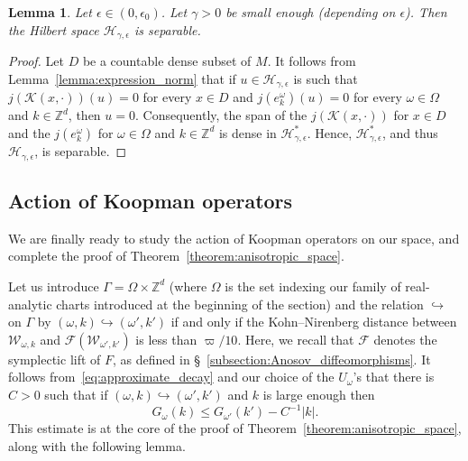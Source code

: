 \documentclass[10pt]{amsart}
\newtheorem{lemm}[theo]{Lemma}\newtheorem{prop}[theo]{Proposition}\newtheorem{coro}[theo]{Corollary}\newtheorem{conj}[theo]{Conjecture}
\theoremstyle{definition}\newtheorem{defi}[theo]{Definition}\newtheorem{rema}[theo]{Remark}\newtheorem{exam}[theo]{Example}\newtheorem{exem}[theo]{Example}\newtheorem{nota}[theo]{Notation}
\newcommand{\p}[1]{\left(#1\right)}
\newcommand{\va}[1]{\left|#1\right|}
\newcommand{\clH}{\mathcal{H}}
\newcommand{\clF}{\mathcal{F}}
\newcommand{\clW}{\mathcal{W}}
\newcommand{\clK}{\mathcal{K}}
\newcommand{\bbZ}{\mathbb{Z}}
\begin{document}
\begin{lemm}\label{lemma:separability}
Let $\epsilon \in (0,\epsilon_0)$. Let $\gamma > 0$ be small enough (depending on $\epsilon$). Then the Hilbert space $\clH_{\gamma,\epsilon}$ is separable.
\end{lemm}

\begin{proof}
Let $D$ be a countable dense subset of $M$. It follows from Lemma~\ref{lemma:expression_norm} that if $u \in \clH_{\gamma,\epsilon}$ is such that $j(\clK (x,\cdot))(u) = 0$ for every $x \in D$ and $j(e_k^\omega)(u)=0$ for every $\omega \in \Omega$ and $k \in \bbZ^d$, then $u = 0$. Consequently, the span of the $j(\clK (x,\cdot))$ for $x \in D$ and the $j(e_k^\omega)$ for $\omega \in \Omega$ and $k \in \bbZ^d$ is dense in $\clH_{\gamma,\epsilon}^*$. Hence, $\clH_{\gamma,\epsilon}^*$, and thus $\clH_{\gamma,\epsilon}$, is separable.
\end{proof}

\subsection{Action of Koopman operators}

We are finally ready to study the action of Koopman operators on our space, and complete the proof of Theorem~\ref{theorem:anisotropic_space}.

Let us introduce $\Gamma = \Omega \times \bbZ^d$ (where $\Omega$ is the set indexing our family of real-analytic charts introduced at the beginning of the section) and the relation $\hookrightarrow$ on $\Gamma$ by $(\omega,k) \hookrightarrow (\omega',k')$ if and only if the Kohn--Nirenberg distance between $\clW_{\omega,k}$ and $\clF\p{\clW_{\omega',k'}}$ is less than $\varpi/10$. Here, we recall that $\clF$ denotes the symplectic lift of $F$, as defined in \S~\ref{subsection:Anosov_diffeomorphisms}. It follows from~\eqref{eq:approximate_decay} and our choice of the $U_\omega$'s that there is $C > 0$ such that if $(\omega,k) \hookrightarrow (\omega',k')$ and $k$ is large enough then
\begin{equation}\label{eq:decay_escape}
G_{\omega}(k) \leq G_{\omega'}(k') - C^{-1} \va{k}.
\end{equation}
This estimate is at the core of the proof of Theorem~\ref{theorem:anisotropic_space}, along with the following lemma.
\end{document}
